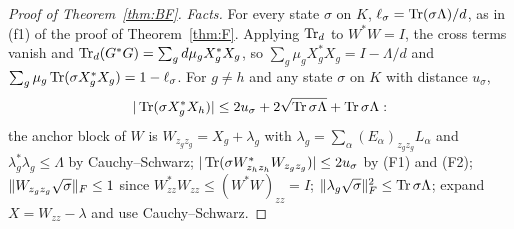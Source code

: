 \begin{proof}[Proof of Theorem~\ref{thm:BF}]
\emph{Facts.} For every state $\sigma$ on $K$, $\ell_\sigma=\operatorname{Tr}(\sigma\Lambda)/d$, as in (f1) of the proof of Theorem~\ref{thm:F}. Applying $\operatorname{Tr}_d$ to $W^*W=I$, the cross terms vanish
and $\operatorname{Tr}_d(G^*G)=\sum_gd\mu_gX_g^*X_g$, so $\sum_g\mu_gX_g^*X_g=I-\Lambda/d$ and $\sum_g\mu_g\operatorname{Tr}(\sigma X_g^*X_g)=1-\ell_\sigma$. For $g\ne h$ and any state $\sigma$ on $K$ with distance
$u_\sigma$,
\begin{equation}\label{eq:anchor}
|\operatorname{Tr}(\sigma X_g^*X_h)|\le2u_\sigma+2\sqrt{\operatorname{Tr}\sigma\Lambda}+\operatorname{Tr}\sigma\Lambda :
\end{equation}
the anchor block of $W$ is $W_{z_gz_g}=X_g+\lambda_g$ with $\lambda_g=\sum_\alpha(E_\alpha)_{z_gz_g}L_\alpha$ and $\lambda_g^*\lambda_g\le\Lambda$ by Cauchy--Schwarz;
$|\operatorname{Tr}(\sigma W_{z_hz_h}^*W_{z_gz_g})|\le2u_\sigma$ by (F1) and (F2); $\lVert W_{z_gz_g}\sqrt\sigma\rVert_F\le1$ since $W_{zz}^*W_{zz}\le(W^*W)_{zz}=I$; $\lVert \lambda_g\sqrt\sigma\rVert_F^2\le\operatorname{Tr}\sigma\Lambda$;
expand $X=W_{zz}-\lambda$ and use Cauchy--Schwarz.


\end{proof}
